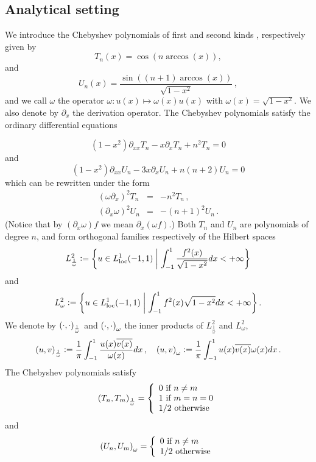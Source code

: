 \documentclass[a4paper]{article}
\begin{document}
\subsection{Analytical setting}

We introduce the Chebyshev polynomials of first and second kinds \cite{mason2002chebyshev}, respectively given by 
\[T_n(x) = \cos(n \arccos(x)),\]
and 
\[U_n(x) = \dfrac{\sin((n+1) \arccos(x))}{\sqrt{1 - x^2}}\,,\]
and we call $\omega$ the operator $\omega:u(x) \mapsto \omega(x)u(x)$ with $\omega(x) = \sqrt{1 - x^2}$. We also denote by  
$\partial_x$ the derivation operator. The Chebyshev polynomials satisfy the ordinary differential equations

$$
	(1-x^2)\partial_{xx}T_n -x\partial_x T_n +n^2T_n =0
$$
and
$$
(1-x^2)\partial_{xx}U_n -3x\partial_xU_n +n(n+2)U_n =0
$$
which can be rewritten under the form
\begin{eqnarray}
	(\omega\partial_x)^2 T_n &=& -n^2T_n\,, \label{cheb1}\\
	(\partial_x\omega)^2 U_n &=& -(n+1)^2U_n\, .\label{cheb2}
\end{eqnarray}
(Notice that by $(\partial_x\omega) f$ we mean $\partial_x(\omega f)$.) Both $T_n$ and $U_n$ are polynomials of degree $n$, and 
form orthogonal families respectively of the Hilbert spaces 
$$L^2_{\frac{1}{\omega}} \mathrel{\mathop:}= \left\{u \in L^1_\textup{loc}(-1,1)\mathrel{}\middle|\mathrel{}\int_{-1}^{1} \dfrac{f^2(x)}{\sqrt{1 - x^2} }dx< + \infty\right\}$$
and 
$$L^2_{\omega} \mathrel{\mathop:}= \left\{u \in L^1_\textup{loc}(-1,1)\mathrel{}\middle|\mathrel{}\int_{-1}^{1} {f^2(x)}{\sqrt{1 - x^2} }dx< + \infty\right\}.$$
We denote by $\left( \cdot,\cdot\right)_\frac{1}{\omega}$ and $\left( \cdot,\cdot\right)_\omega$ the inner products of $L^2_{\frac{1}{\omega}}$ and $L^2_{\omega}$,
\[\left( u,v\right)_{\frac{1}{\omega}} \mathrel{\mathop:}= \frac{1}{\pi}\int_{-1}^{1} \frac{u(x) \overline{v(x)}}{\omega(x)}dx\,, \quad \left( u,v\right)_{\omega} \mathrel{\mathop:}= \frac{1}{\pi}\int_{-1}^{1} {u(x) \overline{v(x)}}{\omega(x)}dx\,.\]
The Chebyshev polynomials satisfy
\begin{equation}
	\left( T_n,T_m\right)_\frac{1}{\omega} = \left\{
	\begin{array}{l}
	0 \mbox{ if } n\ne m\\
	1 \mbox{ if } m=n=0\\
	1/2 \mbox{ otherwise}
	\end{array} 
	\right.
\end{equation}
	and
\begin{equation}
	\left( U_n,U_m\right)_{\omega} = \left\{
	\begin{array}{l}
	0 \mbox{ if } n\ne m\\
	1/2 \mbox{ otherwise}
	\end{array} 
	\right.
\end{equation}
\end{document}
